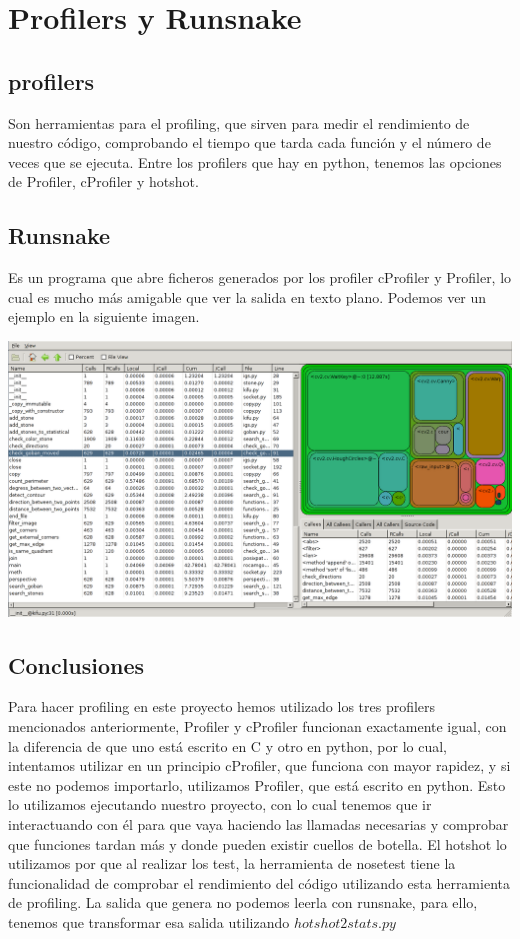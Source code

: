 \documentclass[12pt,a4paper]{report}
\begin{document}
\section{Profilers y Runsnake}

\subsection{profilers} 

Son herramientas para el profiling, que sirven para medir el rendimiento de
nuestro código, comprobando el tiempo que tarda cada función y el número de
veces que se ejecuta. Entre los profilers que hay en python, tenemos las
opciones de Profiler, cProfiler y hotshot.


\subsection{Runsnake} 

Es un programa que abre ficheros generados por los profiler cProfiler y
Profiler, lo cual es mucho más amigable que ver la salida en texto plano.
Podemos ver un ejemplo en la siguiente imagen. 

\includegraphics[scale=0.33]{runsnake.png}

\subsection{Conclusiones}

Para hacer profiling en este proyecto hemos utilizado los tres profilers
mencionados anteriormente, Profiler y cProfiler funcionan exactamente igual, con
la diferencia de que uno está escrito en C y otro en python, por lo cual,
intentamos utilizar en un principio cProfiler, que funciona con mayor rapidez, y
si este no podemos importarlo, utilizamos Profiler, que está escrito en
python. Esto lo utilizamos ejecutando nuestro proyecto, con lo cual tenemos que
ir interactuando con él para que vaya haciendo las llamadas necesarias y
comprobar que funciones tardan más y donde pueden existir cuellos de botella. 
El hotshot lo utilizamos por que al realizar los test, la herramienta de
nosetest tiene la funcionalidad de comprobar el rendimiento del código
utilizando esta herramienta de profiling. La salida que genera no podemos leerla
con runsnake, para ello, tenemos que transformar esa salida utilizando
$hotshot2stats.py$
\end{document}
